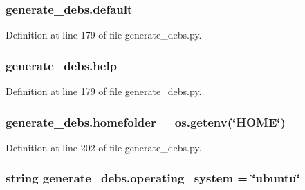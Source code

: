 \subsubsection[{\texorpdfstring{default}{default}}]{\setlength{\rightskip}{0pt plus 5cm}generate\+\_\+debs.\+default}\hypertarget{namespacegenerate__debs_a3d67a92b7eb3a59c397dc9fdd1c67558}{}\label{namespacegenerate__debs_a3d67a92b7eb3a59c397dc9fdd1c67558}


Definition at line 179 of file generate\+\_\+debs.\+py.

\subsubsection[{\texorpdfstring{help}{help}}]{\setlength{\rightskip}{0pt plus 5cm}generate\+\_\+debs.\+help}\hypertarget{namespacegenerate__debs_ab09f4294da5036d5f6881672de9ed9c7}{}\label{namespacegenerate__debs_ab09f4294da5036d5f6881672de9ed9c7}


Definition at line 179 of file generate\+\_\+debs.\+py.

\subsubsection[{\texorpdfstring{homefolder}{homefolder}}]{\setlength{\rightskip}{0pt plus 5cm}generate\+\_\+debs.\+homefolder = os.\+getenv(\char`\"{}H\+O\+ME\char`\"{})}\hypertarget{namespacegenerate__debs_aeb83979be2939a8059435a906a91f682}{}\label{namespacegenerate__debs_aeb83979be2939a8059435a906a91f682}


Definition at line 202 of file generate\+\_\+debs.\+py.

\subsubsection[{\texorpdfstring{operating\+\_\+system}{operating_system}}]{\setlength{\rightskip}{0pt plus 5cm}string generate\+\_\+debs.\+operating\+\_\+system = \char`\"{}ubuntu\char`\"{}}\hypertarget{namespacegenerate__debs_a162df833915546009650658683731f94}{}\label{namespacegenerate__debs_a162df833915546009650658683731f94}


